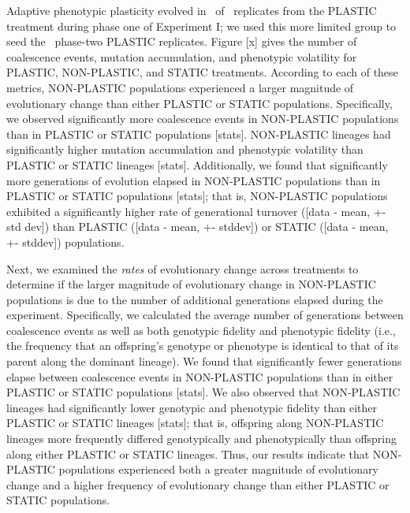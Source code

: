 Adaptive phenotypic plasticity evolved in \evolutionaryChangeRatePlasticReps\ of \evolutionaryChangeRateReplicates\ replicates from the PLASTIC treatment during phase one of Experiment I; we used this more limited group to seed the \evolutionaryChangeRatePlasticReps\ phase-two PLASTIC replicates.
Figure [x] gives the number of coalescence events, mutation accumulation, and phenotypic volatility for PLASTIC, NON-PLASTIC, and STATIC treatments.
According to each of these metrics, NON-PLASTIC populations experienced a larger magnitude of evolutionary change than either PLASTIC or STATIC populations.
Specifically, we observed significantly more coalescence events in NON-PLASTIC populations than in PLASTIC or STATIC populations [stats].
NON-PLASTIC lineages had significantly higher mutation accumulation and phenotypic volatility than PLASTIC or STATIC lineages [stats].
Additionally, we found that significantly more generations of evolution elapsed in NON-PLASTIC populations than in PLASTIC or STATIC populations [stats]; that is, NON-PLASTIC populations exhibited a significantly higher rate of generational turnover ([data - mean, +- std dev]) than PLASTIC ([data - mean, +- stddev]) or STATIC ([data - mean, +- stddev]) populations.

Next, we examined the \textit{rates} of evolutionary change across treatments to determine if the larger magnitude of evolutionary change in NON-PLASTIC populations is due to the number of additional generations elapsed during the experiment.
Specifically, we calculated the average number of generations between coalescence events as well as both genotypic fidelity and phenotypic fidelity (i.e., the frequency that an offspring's genotype or phenotype is identical to that of its parent along the dominant lineage).
We found that significantly fewer generations elapse between coalescence events in NON-PLASTIC populations than in either PLASTIC or STATIC populations [stats].
We also observed that NON-PLASTIC lineages had significantly lower genotypic and phenotypic fidelity than either PLASTIC or STATIC lineages [stats]; that is, offspring along NON-PLASTIC lineages more frequently differed genotypically and phenotypically than offspring along either PLASTIC or STATIC lineages.
Thus, our results indicate that NON-PLASTIC populations experienced both a greater magnitude of evolutionary change and a higher frequency of evolutionary change than either PLASTIC or STATIC populations.

